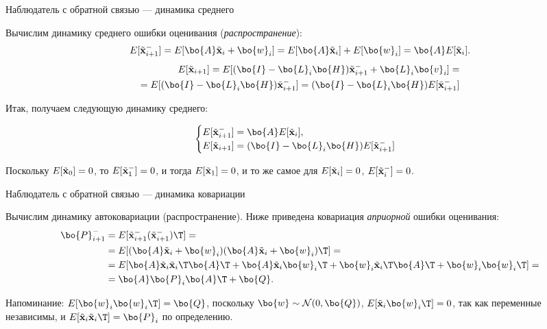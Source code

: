 \documentclass{beamer}
\newcommand{\btil}[1] {\Tilde{\mathbf{#1}}}
\begin{document}
\begin{frame}{Наблюдатель с обратной связью — динамика среднего}
	\begin{flushleft}
		
		Вычислим динамику среднего ошибки оценивания (\emph{распространение}):
		\begin{align*}
			E[\btil{x}_{i+1}^-] = 
			E[\bo{A} \btil{x}_i + \bo{w}_i] = 
			E[\bo{A} \btil{x}_i] + E[\bo{w}_i]  =
			\bo{A}E[\btil{x}_i].
		\end{align*}	
		\begin{align*}
			E[\btil{x}_{i+1}] = 
			E[(\bo{I} - \bo{L}_i \bo{H}) \btil{x}_{i+1}^- + \bo{L}_i\bo{v}_i] =\\
			=E[(\bo{I} - \bo{L}_i \bo{H}) \btil{x}_{i+1}^-]
			= 
			(\bo{I} - \bo{L}_i \bo{H}) E[\btil{x}_{i+1}^-]
		\end{align*}				
		
		Итак, получаем следующую динамику среднего:
		
		\begin{equation}
			\begin{cases}
				E[\btil{x}_{i+1}^-] = \bo{A} E[\btil{x}_i], \\
				E[\btil{x}_{i+1}] = (\bo{I} - \bo{L}_i \bo{H}) E[\btil{x}_{i+1}^-]
			\end{cases}
		\end{equation}		
		
		Поскольку $E[\btil{x}_0] = 0$, то $E[\btil{x}_1^-] = 0$, и тогда $E[\btil{x}_1] = 0$, и то же самое для $E[\btil{x}_i] = 0$, $E[\btil{x}_i^-] = 0$.
		
	\end{flushleft}
\end{frame}



\begin{frame}{Наблюдатель с обратной связью — динамика ковариации}
	\begin{flushleft}
		
		Вычислим динамику автоковариации (распространение). Ниже приведена ковариация \emph{априорной} ошибки оценивания:
		\begin{align*}
			\bo{P}_{i+1}^- 
			&= E[\btil{x}_{i+1}^- (\btil{x}_{i+1}^-)\T] = \\
			&= E[ (\bo{A} \btil{x}_i + \bo{w}_i) (\bo{A} \btil{x}_i + \bo{w}_i)\T] = 
			\\
			&= E[ \bo{A} \btil{x}_i \btil{x}_i\T   \bo{A}\T
			+ 
			\bo{A} \btil{x}_i \bo{w}_i\T 
			+
			\bo{w}_i\btil{x}_i \T\bo{A}\T
			+
			\bo{w}_i\bo{w}_i\T ]=\\
			&= \bo{A} \bo{P}_i \bo{A}\T +\bo{Q}.
		\end{align*}		
		
		\bigskip
		
		\textcolor{mydarkgray}{Напоминание: $E[\bo{w}_i \bo{w}_i\T] = \bo{Q}$, поскольку $\bo{w} \sim \mathcal{N} (0, \bo{Q})$, $E[\btil{x}_i \bo{w}_i\T] = 0$, так как переменные независимы, и $E[\btil{x}_i \btil{x}_i\T] = \bo{P}_i$ по определению.}
		
		
	\end{flushleft}
\end{frame}
\end{document}
